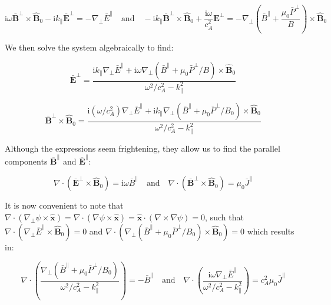 \begin{equation}
    \mathrm{i}\omega\bar{\mathbf{B}}^\perp\times\mathbf{\hat{B}}_0-\mathrm{i}k_\parallel\bar{\mathbf{E}}^\perp=-\nabla_\perp\bar{E}^\parallel\quad\text{and}\quad-\mathrm{i}k_\parallel\bar{\mathbf{B}}^\perp\times\mathbf{\hat{B}}_0+\frac{\mathrm{i}\omega}{c_A^2}\mathbf{E}^\perp=-\nabla_\perp\left(\bar{B}^\parallel+\frac{\mu_0\bar{P}^\perp}{B}\right)\times\mathbf{\hat{B}}_0
\end{equation}

We then solve the system algebraically to find:

\begin{equation}
    \bar{\mathbf{E}}^\perp=\frac{\mathrm{i}k_\parallel\nabla_\perp\bar{E}^\parallel+\mathrm{i}\omega\nabla_\perp(\bar{B}^\parallel+\mu_0\bar{P}^\perp/B)\times\mathbf{\hat{B}}_0}{\omega^2/c_A^2-k_\parallel^2}
\end{equation}

\begin{equation}
    \bar{\mathbf{B}}^\perp\times\mathbf{\hat{B}}_0=\frac{\mathrm{i}(\omega/c_A^2)\nabla_\perp\bar{E}^\parallel+\mathrm{i}k_\parallel\nabla_\perp(\bar{B}^\parallel+\mu_0\bar{P}^\perp/B_0)\times\mathbf{\hat{B}}_0}{\omega^2/c_A^2-k_\parallel^2}
\end{equation}

Although the expressions seem frightening, they allow us to find the parallel components $\bar{\mathbf{B}}^\parallel$ and $\bar{\mathbf{E}}^\parallel$:

\begin{equation}
    \nabla\cdot(\bar{\mathbf{E}}^\perp\times\mathbf{\hat{B}}_0)=\mathrm{i}\omega\bar{B}^\parallel\quad\text{and}\quad\nabla\cdot(\bar{\mathbf{B}}^\perp\times\mathbf{\hat{B}}_0)=\mu_0\bar{J}^\parallel
\end{equation}

It is now convenient to note that $\nabla\cdot(\nabla_\perp\psi\times\mathbf{\hat{x}})=\nabla\cdot(\nabla\psi\times\mathbf{\hat{x}})=\mathbf{\hat{x}}\cdot(\nabla\times\nabla\psi)=0$, such that $\nabla\cdot(\nabla_\perp\bar{E}^\parallel\times\mathbf{\hat{B}}_0)=0$ and $\nabla\cdot(\nabla_\perp(\bar{B}^\parallel+\mu_0\bar{P}^\perp/B_0)\times\mathbf{\hat{B}}_0)=0$ which results in:

\begin{equation}
    \nabla\cdot\left(\frac{\nabla_\perp(\bar{B}^\parallel+\mu_0\bar{P}^\perp/B_0)}{\omega^2/c_A^2-k_\parallel^2}\right)=-\bar{B}^\parallel\quad\text{and}\quad\nabla\cdot\left(\frac{\mathrm{i}\omega\nabla_\perp\bar{E}^\parallel}{\omega^2/c_A^2-k_\parallel^2}\right)=c_A^2\mu_0\bar{J}^\parallel
\end{equation}

